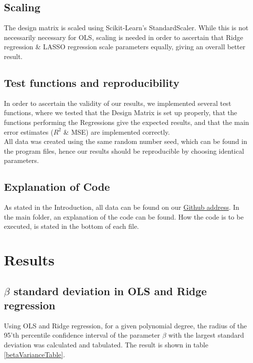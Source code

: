\documentclass[11pt,a4paper,titlepage]{article}
\begin{document}
\subsection{Scaling}
The design matrix is scaled using Scikit-Learn's StandardScaler. While this is not necessarily necessary for OLS, scaling is needed in order to ascertain that Ridge regression \& LASSO regression scale parameters equally, giving an overall better result. 
\subsection{Test functions and reproducibility}
In order to ascertain the validity of our results, we implemented several test functions, where we tested that the Design Matrix is set up properly, that the functions performing the Regressions give the expected results, and that the main error estimates ($R^2$ \& MSE) are implemented correctly. \\
All data was created using the same random number seed, which can be found in the program files, hence our results should be reproducible by choosing identical parameters.
\subsection{Explanation of Code}
As stated in the Introduction, all data can be found on our \href{https://github.com/schraderSimon/FYS-STK/tree/master/project1}{Github address}. In the main folder, an explanation of the code can be found. How the code is to be executed, is stated in the bottom of each file.
\section{Results}

\subsection{$\beta$ standard deviation in OLS and Ridge regression}
Using OLS and Ridge regression, for a given polynomial degree, the radius of the 95'th percentile confidence interval of the parameter $\beta$ with the largest standard deviation was calculated and tabulated. The result is shown in table \ref{betaVarianceTable}.
\end{document}
